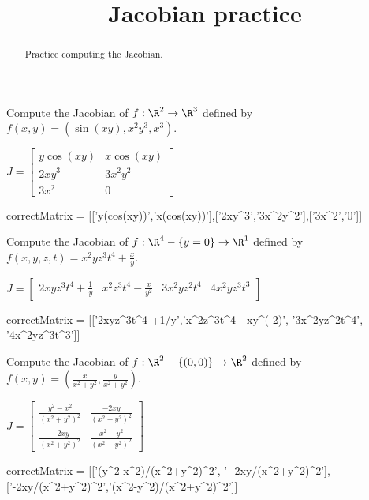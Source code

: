 \documentclass{ximera}
\title{Jacobian practice}
\begin{document}
	\begin{abstract}
          Practice computing the Jacobian.
	\end{abstract}
	
	\begin{question}	
		Compute the Jacobian of $f:\R^2 \to \R^3$ defined by $f(x,y) = (\sin(xy),x^2y^3, x^3)$.
		\begin{solution}
		\begin{hint}
			\(J = \begin{bmatrix} y\cos(xy) & x\cos(xy) \\ 2xy^3 & 3x^2y^2 \\ 3x^2 & 0 \end{bmatrix}\)
		\end{hint}
		\begin{matrix-answer}[name=J]
			correctMatrix  = [['y(cos(xy))','x(cos(xy))'],['2xy^3','3x^2y^2'],['3x^2','0']]
		\end{matrix-answer}
		\end{solution}
	\end{question}
	
	\begin{question}	
		Compute the Jacobian of $f:\R^4 - \{y=0\} \to \R^1$ defined by $f(x,y,z,t) = x^2yz^3t^4+\frac{x}{y}$.
		\begin{solution}
		\begin{hint}
			\(J = \begin{bmatrix} 2xyz^3t^4 +\frac{1}{y} & x^2z^3t^4 - \frac{x}{y^2} & 3x^2yz^2t^4 & 4x^2yz^3t^3\end{bmatrix}\)
		\end{hint}
		\begin{matrix-answer}[name=J]
			correctMatrix  = [['2xyz^3t^4 +1/y','x^2z^3t^4 - xy^(-2)', '3x^2yz^2t^4', '4x^2yz^3t^3']]
		\end{matrix-answer}
		\end{solution}
	\end{question}
	
	\begin{question}	
		Compute the Jacobian of $f:\R^2 - \{(0,0)\} \to \R^2$ defined by $f(x,y) = (\frac{x}{x^2+y^2},\frac{y}{x^2+y^2})$.
		\begin{solution}
		\begin{hint}
			\(J = \begin{bmatrix} \frac{y^2-x^2}{(x^2+y^2)^2} & \frac{-2xy}{(x^2+y^2)^2} \\   \frac{-2xy}{(x^2+y^2)^2} & \frac{x^2-y^2}{(x^2+y^2)^2}  \end{bmatrix}\)
		\end{hint}
		\begin{matrix-answer}[name=J]
			correctMatrix  = [['(y^2-x^2)/(x^2+y^2)^2', ' -2xy/(x^2+y^2)^2'],['-2xy/(x^2+y^2)^2','(x^2-y^2)/(x^2+y^2)^2']]
		\end{matrix-answer}
		\end{solution}
	\end{question}
	
\end{document}

